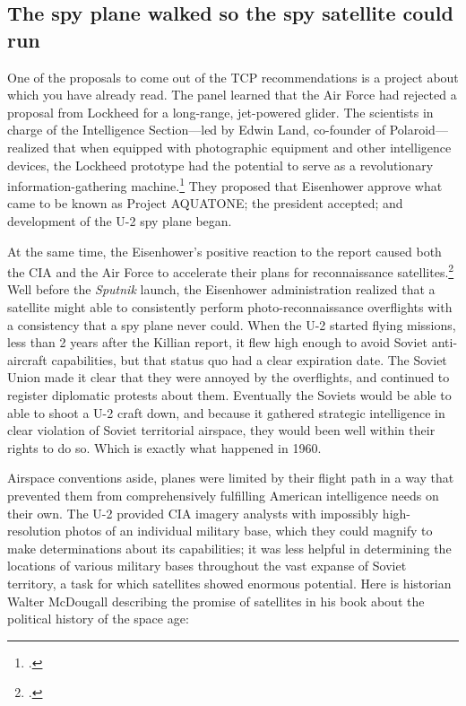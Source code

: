\documentclass{report}
\begin{document}
\subsection{The spy plane walked so the spy satellite could run}
One of the proposals to come out of the TCP recommendations is a project about which you have already read. The panel learned that the Air Force had rejected a proposal from Lockheed for a long-range, jet-powered glider. The scientists in charge of the Intelligence Section---led by Edwin Land, co-founder of Polaroid---realized that when equipped with photographic equipment and other intelligence devices, the Lockheed prototype had the potential to serve as a revolutionary information-gathering machine.\footcite[p.~81-82]{killian_sputnik_1977} They proposed that Eisenhower approve what came to be known as Project AQUATONE; the president accepted; and development of the U-2 spy plane began.

At the same time, the Eisenhower's positive reaction to the report caused both the CIA and the Air Force to accelerate their plans for reconnaissance satellites.\footcite[p.~83]{killian_sputnik_1977} Well before the \emph{Sputnik} launch, the Eisenhower administration realized that a satellite might able to consistently perform photo-reconnaissance overflights with a consistency that a spy plane never could. When the U-2 started flying missions, less than 2 years after the Killian report, it flew high enough to avoid Soviet anti-aircraft capabilities, but that status quo had a clear expiration date. The Soviet Union made it clear that they were annoyed by the overflights, and continued to register diplomatic protests about them. Eventually the Soviets would be able to able to shoot a U-2 craft down, and because it gathered strategic intelligence in clear violation of Soviet territorial airspace, they would been well within their rights to do so. Which is exactly what happened in 1960.

Airspace conventions aside, planes were limited by their flight path in a way that prevented them from comprehensively fulfilling American intelligence needs on their own. The U-2 provided CIA imagery analysts with impossibly high-resolution photos of an individual military base, which they could magnify to make determinations about its capabilities; it was less helpful in determining the locations of various military bases throughout the vast expanse of Soviet territory, a task for which satellites showed enormous potential. Here is historian Walter McDougall describing the promise of satellites in his book about the political history of the space age:
\end{document}
